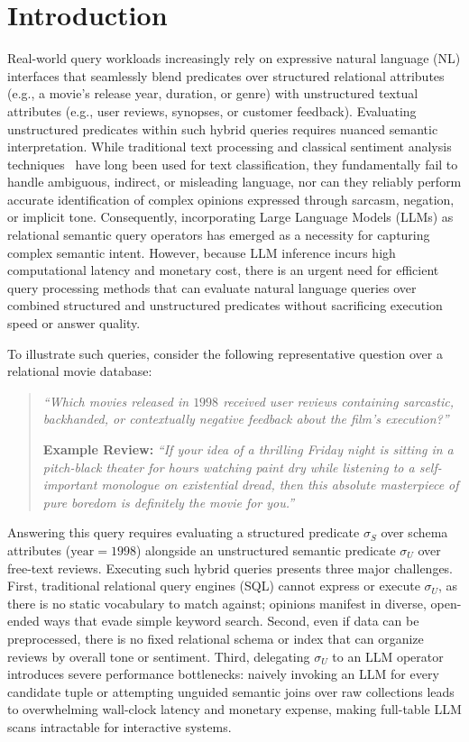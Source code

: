 \section{Introduction}
\label{sec:intro}
Real-world query workloads increasingly rely on expressive natural language (NL) interfaces that seamlessly blend predicates over structured relational attributes (e.g., a movie's release year, duration, or genre) with unstructured textual attributes (e.g., user reviews, synopses, or customer feedback). Evaluating unstructured predicates within such hybrid queries requires nuanced semantic interpretation. While traditional text processing and classical sentiment analysis techniques~\cite{Chandan2025ACS} have long been used for text classification, they fundamentally fail to handle ambiguous, indirect, or misleading language, nor can they reliably perform accurate identification of complex opinions expressed through sarcasm, negation, or implicit tone. Consequently, incorporating Large Language Models (LLMs) as relational semantic query operators has emerged as a necessity for capturing complex semantic intent. However, because LLM inference incurs high computational latency and monetary cost, there is an urgent need for efficient query processing methods that can evaluate natural language queries over combined structured and unstructured predicates without sacrificing execution speed or answer quality.

To illustrate such queries, consider the following representative question over a relational movie database:
\begin{quote}
\textit{``Which movies released in $1998$ received user reviews containing sarcastic, backhanded, or contextually negative feedback about the film's execution?''}

\smallskip
\noindent\textbf{Example Review:} \textit{``If your idea of a thrilling Friday night is sitting in a pitch-black theater for  hours watching paint dry while listening to a self-important monologue on existential dread, then this absolute masterpiece of pure boredom is definitely the movie for you.''}
\end{quote}
Answering this query requires evaluating a structured predicate $\sigma_S$ over schema attributes ($\text{year} = 1998$) alongside an unstructured semantic predicate $\sigma_U$ over free-text reviews. Executing such hybrid queries presents three major challenges. First, traditional relational query engines (SQL) cannot express or execute $\sigma_U$, as there is no static vocabulary to match against;  opinions manifest in diverse, open-ended ways that evade simple keyword search. Second, even if data can be preprocessed, there is no fixed relational schema or index that can organize reviews by overall tone or sentiment. Third, delegating $\sigma_U$ to an LLM operator introduces severe performance bottlenecks: naively invoking an LLM for every candidate tuple or attempting unguided semantic joins over raw collections leads to overwhelming wall-clock latency and monetary expense, making full-table LLM scans intractable for interactive systems.

